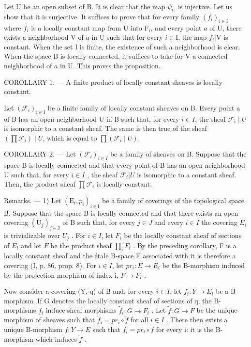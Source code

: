 Let U be an open subset of B. It is clear that the map \(\psi_{\mathrm{U}}\) is injective. Let us show that it is surjective. It suffices to prove that for every family \((f_i)_{i\in \mathrm{I}}\) where \(f_{i}\) is a locally constant map from U into \(\mathrm{F}_i\), and every point \(a\) of U, there exists a neighborhood V of \(a\) in U such that for every \(i\in \mathrm{I}\), the map \(f_{i}|\mathrm{V}\) is constant. When the set I is finite, the existence of such a neighborhood is clear. When the space B is locally connected, it suffices to take for V a connected neighborhood of \(a\) in U. This proves the proposition.

COROLLARY 1. --- A finite product of locally constant sheaves is locally constant.

Let \((\mathcal{F}_{i})_{i\in\mathrm{I}}\) be a finite family of locally constant sheaves on B. Every point a of B has an open neighborhood U in B such that, for every \(i\in I\), the sheaf \(\mathcal{F}_{i}\mid U\) is isomorphic to a constant sheaf. The same is then true of the sheaf \((\prod\mathcal{F}_{i})\mid U\), which is equal to \(\prod(\mathcal{F}_{i}\mid U)\).

COROLLARY 2. --- Let \((\mathcal{F}_{i})_{i\in I}\) be a family of sheaves on B. Suppose that the space B is locally connected and that every point of B has an open neighborhood U such that, for every \(i\in I\) , the sheaf \(\mathcal{F}_{i}|U\) is isomorphic to a constant sheaf. Then, the product sheaf \(\prod \mathcal{F}_{i}\) is locally constant.

Remarks. --- 1) Let \((\mathrm{E}_{i}, p_{i})_{i \in \mathrm{I}}\) be a family of coverings of the topological space B. Suppose that the space B is locally connected and that there exists an open covering \((\mathrm{U}_{j})_{j \in \mathrm{J}}\) of B such that, for every \(j \in J\) and every \(i \in I\) the covering \(E_{i}\) is trivializable over \(U_{j}\) . For \(i \in I\), let \(F_{i}\) be the locally constant sheaf of sections of \(E_{i}\) and let \(F\) be the product sheaf \(\prod_{i} F_{i}\) . By the preceding corollary, F is a locally constant sheaf and the étale B-space E associated with it is therefore a covering (I, p. 86, prop. 8). For \(i \in I\), let \(pr_{i}: E \to E_{i}\) be the B-morphism induced by the projection morphism of index i, \(F \to F_{i}\) .

Now consider a covering (Y, q) of B and, for every \(i \in I\), let \(f_i \colon Y \to E_i\) be a B-morphism. If G denotes the locally constant sheaf of sections of q, the B-morphisms \(f_i\) induce sheaf morphisms \(\widetilde{f}_i \colon G \to F_i\) . Let \(\widetilde{f} \colon G \to F\) be the unique morphism of sheaves such that \(\widetilde{f}_i = pr_i \circ \widetilde{f}\) for all \(i \in I\) . There then exists a unique B-morphism \(f \colon Y \to E\) such that \(f_i = pr_i \circ f\) for every i: it is the B-morphism which induces \(\widetilde{f}\) .


